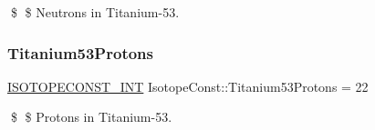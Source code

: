 \$ \$ Neutrons in Titanium-\/53. \mbox{\label{group___isotope_const-_titanium-_ti53_gaf63fc5dec3588dffde6369cdca8190b1}} 
\subsubsection{\texorpdfstring{Titanium53\+Protons}{Titanium53Protons}}
{\footnotesize\ttfamily \mbox{\hyperlink{group___isotope_const-_macros_ga5f18360b3e99483a35c32d789e62621c}{I\+S\+O\+T\+O\+P\+E\+C\+O\+N\+S\+T\+\_\+\+I\+NT}} Isotope\+Const\+::\+Titanium53\+Protons = 22}

\$ \$ Protons in Titanium-\/53. 
